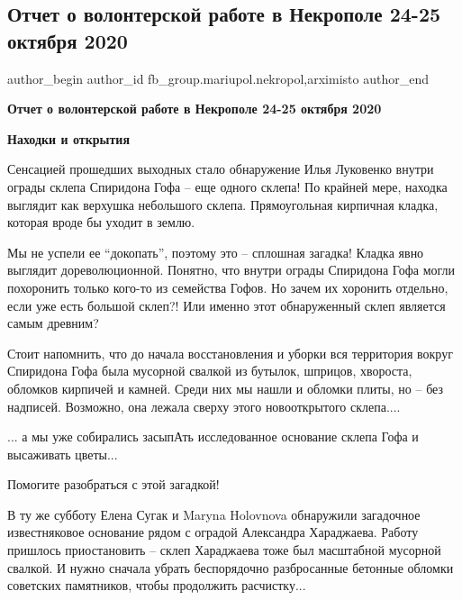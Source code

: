  
 
 
 
 

\subsection{Отчет о волонтерской работе в Некрополе 24-25 октября 2020}
\label{sec:29_10_2020.fb.fb_group.mariupol.nekropol.1.otchet_volonter_rabota_24_25_oktjabrja_2020}
 
\ifcmt
 author_begin
   author_id fb_group.mariupol.nekropol,arximisto
 author_end
\fi

\bigskip
\textbf{Отчет о волонтерской работе в Некрополе 24-25 октября 2020}

\textbf{Находки и открытия}
\bigskip

Сенсацией прошедших выходных стало обнаружение Илья Луковенко внутри ограды
склепа Спиридона Гофа – еще одного склепа! По крайней мере, находка выглядит
как верхушка небольшого склепа. Прямоугольная кирпичная кладка, которая вроде
бы уходит в землю.

Мы не успели ее \enquote{докопать}, поэтому это – сплошная загадка! Кладка явно
выглядит дореволюционной. Понятно, что внутри ограды Спиридона Гофа могли
похоронить только кого-то из семейства Гофов. Но зачем их хоронить отдельно,
если уже есть большой склеп?! Или именно этот обнаруженный склеп является самым
древним?

Стоит напомнить, что до начала восстановления и уборки вся территория вокруг
Спиридона Гофа была мусорной свалкой из бутылок, шприцов, хвороста, обломков
кирпичей и камней. Среди них мы нашли и обломки плиты, но – без надписей.
Возможно, она лежала сверху этого новооткрытого склепа....

... а мы уже собирались засыпАть исследованное основание склепа Гофа и высаживать цветы...

Помогите разобраться с этой загадкой!

В ту же субботу Елена Сугак и Maryna Holovnova обнаружили загадочное
известняковое основание рядом с оградой Александра Хараджаева. Работу пришлось
приостановить – склеп Хараджаева тоже был масштабной мусорной свалкой. И нужно
сначала убрать беспорядочно разбросанные бетонные обломки советских памятников,
чтобы продолжить расчистку...

